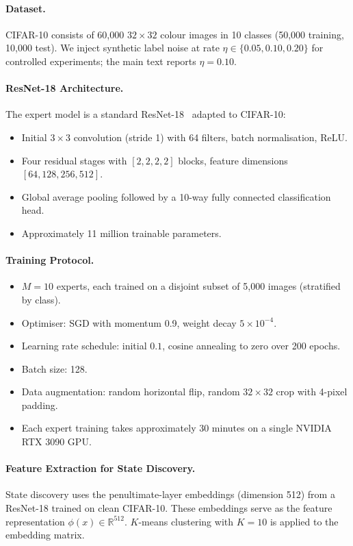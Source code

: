 \documentclass[article]{amsart}
\theoremstyle{definition}
\begin{document}
\paragraph{Dataset.}
CIFAR-10 consists of 60,000 $32 \times 32$ colour images in 10 classes (50,000 training, 10,000 test). We inject synthetic label noise at rate $\eta \in \{0.05, 0.10, 0.20\}$ for controlled experiments; the main text reports $\eta = 0.10$.

\paragraph{ResNet-18 Architecture.}
The expert model is a standard ResNet-18~\cite{he2016resnet} adapted to CIFAR-10:
\begin{itemize}
    \item Initial $3 \times 3$ convolution (stride 1) with 64 filters, batch normalisation, ReLU.
    \item Four residual stages with $[2, 2, 2, 2]$ blocks, feature dimensions $[64, 128, 256, 512]$.
    \item Global average pooling followed by a 10-way fully connected classification head.
    \item Approximately 11 million trainable parameters.
\end{itemize}

\paragraph{Training Protocol.}
\begin{itemize}
    \item $M = 10$ experts, each trained on a disjoint subset of 5,000 images (stratified by class).
    \item Optimiser: SGD with momentum 0.9, weight decay $5 \times 10^{-4}$.
    \item Learning rate schedule: initial $0.1$, cosine annealing to zero over 200 epochs.
    \item Batch size: 128.
    \item Data augmentation: random horizontal flip, random $32 \times 32$ crop with 4-pixel padding.
    \item Each expert training takes approximately 30 minutes on a single NVIDIA RTX 3090 GPU.
\end{itemize}

\paragraph{Feature Extraction for State Discovery.}
State discovery uses the penultimate-layer embeddings (dimension 512) from a ResNet-18 trained on clean CIFAR-10. These embeddings serve as the feature representation $\phi(x) \in \mathbb{R}^{512}$. $K$-means clustering with $K = 10$ is applied to the embedding matrix.
\end{document}
